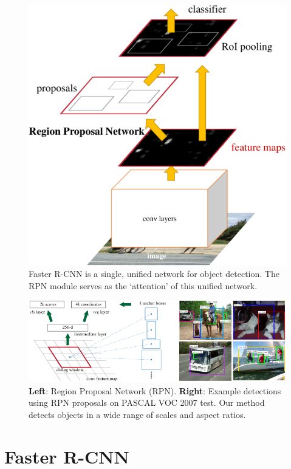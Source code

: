 \documentclass[10pt,journal,cspaper,compsoc]{IEEEtran}
\begin{document}
\begin{figure}[t]
\centering
\includegraphics[width=0.95\linewidth]{eps/model}
\caption{Faster R-CNN is a single, unified network for object detection. The RPN module serves as the `attention' of this unified network.}
\label{fig:model}
\end{figure}

\begin{figure}[t]
\centering
\includegraphics[width=0.98\linewidth]{eps/rpn}
\caption{\textbf{Left}: Region Proposal Network (RPN). \textbf{Right}: Example detections using RPN proposals on PASCAL VOC 2007 test. Our method detects objects in a wide range of scales and aspect ratios.}
\label{fig:rpn}
\end{figure}

\section{Faster R-CNN}
\end{document}
